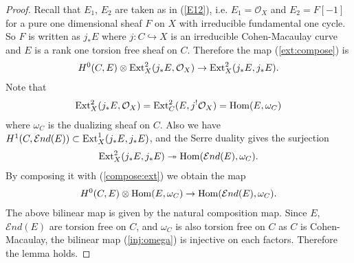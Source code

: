 \documentclass[11pt]{amsart}
\theoremstyle{plain}
\newcommand{\eE}{\mathcal{E}}
\newcommand{\oO}{\mathcal{O}}
\newcommand{\Hom}{\mathop{\rm Hom}\nolimits}
\newcommand{\Ext}{\mathop{\rm Ext}\nolimits}
\begin{document}
\begin{proof}
Recall that 
 $E_1$, $E_2$ are taken as in (\ref{E12}), 
i.e. $E_1=\oO_X$ and $E_2=F[-1]$ for a pure one dimensional 
sheaf $F$ on $X$ 
with irreducible fundamental one cycle. 
 So $F$ is written as $j_{\ast}E$ 
where $j \colon C \hookrightarrow X$ is an irreducible
 Cohen-Macaulay curve
and $E$ is a rank one torsion free sheaf on $C$. 
Therefore the map (\ref{ext:compose}) is 
\begin{align}\label{compose:ext}
H^0(C, E) \otimes \Ext_X^2(j_{\ast}E, \oO_X)
\to \Ext_X^2(j_{\ast}E, j_{\ast}E). 
\end{align}
Note that 
\begin{align*}
\Ext_X^2(j_{\ast}E, \oO_X)=
\Ext_C^2(E, j^{!}\oO_X)=
\Hom(E, \omega_C)
\end{align*}
where $\omega_C$ is the dualizing sheaf on $C$. 
Also we have 
$H^1(C, \eE nd(E)) \subset \Ext_X^1(j_{\ast}E, j_{\ast}E)$, 
and the Serre duality gives the surjection
\begin{align*}
\Ext_X^2(j_{\ast}E, j_{\ast}E) \twoheadrightarrow
\Hom(\eE nd(E), \omega_C). 
\end{align*}
By composing it with (\ref{compose:ext}) we obtain the map
\begin{align}\label{inj:omega}
H^0(C, E) \otimes \Hom(E, \omega_C) \to
\Hom(\eE nd(E), \omega_C). 
\end{align}
The above bilinear map is 
given by the natural composition map. 
Since $E$, $\eE nd(E)$ are torsion free on $C$, 
and $\omega_C$ is also torsion free on $C$ as 
$C$ is Cohen-Macaulay, the 
bilinear map (\ref{inj:omega}) is injective on each factors. 
Therefore the lemma holds. 
\end{proof}
\end{document}
